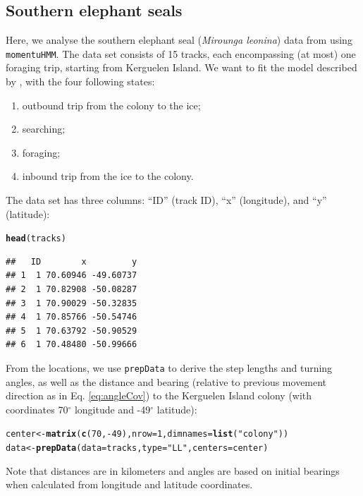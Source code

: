 \documentclass[12pt]{article}\usepackage[]{graphicx}\usepackage[]{xcolor}
\makeatletter
\newcommand{\hlnum}[1]{\textcolor[rgb]{0.686,0.059,0.569}{#1}}%
\newcommand{\hlstr}[1]{\textcolor[rgb]{0.192,0.494,0.8}{#1}}%
\newcommand{\hlopt}[1]{\textcolor[rgb]{0,0,0}{#1}}%
\newcommand{\hlstd}[1]{\textcolor[rgb]{0.345,0.345,0.345}{#1}}%
\newcommand{\hlkwb}[1]{\textcolor[rgb]{0.69,0.353,0.396}{#1}}%
\newcommand{\hlkwc}[1]{\textcolor[rgb]{0.333,0.667,0.333}{#1}}%
\newcommand{\hlkwd}[1]{\textcolor[rgb]{0.737,0.353,0.396}{\textbf{#1}}}%
\newenvironment{kframe}{%
 \def\at@end@of@kframe{}%
 \ifinner\ifhmode%
  \def\at@end@of@kframe{\end{minipage}}%
  \begin{minipage}{\columnwidth}%
 \fi\fi%
 \def\FrameCommand##1{\hskip\@totalleftmargin \hskip-\fboxsep
 \colorbox{shadecolor}{##1}\hskip-\fboxsep
     \hskip-\linewidth \hskip-\@totalleftmargin \hskip\columnwidth}%
 \MakeFramed {\advance\hsize-\width
   \@totalleftmargin\z@ \linewidth\hsize
   \@setminipage}}%
 {\par\unskip\endMakeFramed%
 \at@end@of@kframe}
\newenvironment{knitrout}{}{} %
\newcommand{\stoptocwriting}{%
  \addtocontents{toc}{\protect\setcounter{tocdepth}{-5}}}
\makeatother
\begin{document}
\subsection{Southern elephant seals}
\label{sec:ses}
\stoptocwriting
Here, we analyse the southern elephant seal (\emph{Mirounga leonina}) data from \cite{MichelotEtAl2017} using \verb|momentuHMM|. The data set consists of 15 tracks, each encompassing (at most) one foraging trip, starting from Kerguelen Island. We want to fit the model described by \cite{MichelotEtAl2017}, with the four following states:
\begin{enumerate}
\item outbound trip from the colony to the ice;
\item searching;
\item foraging;
\item inbound trip from the ice to the colony.
\end{enumerate}

The data set has three columns: ``ID'' (track ID), ``x'' (longitude), and ``y'' (latitude):

\begin{knitrout}
\color{fgcolor}\begin{kframe}
\begin{alltt}
\hlkwd{head}\hlstd{(tracks)}
\end{alltt}
\begin{verbatim}
##   ID        x         y
## 1  1 70.60946 -49.60737
## 2  1 70.82908 -50.08287
## 3  1 70.90029 -50.32835
## 4  1 70.85766 -50.54746
## 5  1 70.63792 -50.90529
## 6  1 70.48480 -50.99666
\end{verbatim}
\end{kframe}
\end{knitrout}

From the locations, we use \verb|prepData| to derive the step lengths and turning angles, as well as the distance and bearing (relative to previous movement direction as in Eq. \ref{eq:angleCov}) to the Kerguelen Island colony (with coordinates 70$^{\circ}$ longitude and -49$^{\circ}$ latitude):
\begin{knitrout}
\color{fgcolor}\begin{kframe}
\begin{alltt}
\hlstd{center} \hlkwb{<-} \hlkwd{matrix}\hlstd{(}\hlkwd{c}\hlstd{(}\hlnum{70}\hlstd{,}\hlopt{-}\hlnum{49}\hlstd{),}\hlkwc{nrow}\hlstd{=}\hlnum{1}\hlstd{,}\hlkwc{dimnames}\hlstd{=}\hlkwd{list}\hlstd{(}\hlstr{"colony"}\hlstd{))}
\hlstd{data} \hlkwb{<-} \hlkwd{prepData}\hlstd{(}\hlkwc{data}\hlstd{=tracks,} \hlkwc{type}\hlstd{=}\hlstr{"LL"}\hlstd{,} \hlkwc{centers}\hlstd{=center)}
\end{alltt}
\end{kframe}
\end{knitrout}
Note that distances are in kilometers and angles are based on initial bearings \citep[using geosphere::bearing;][]{Hijmans2016geo} when calculated from longitude and latitude coordinates.  
\end{document}
